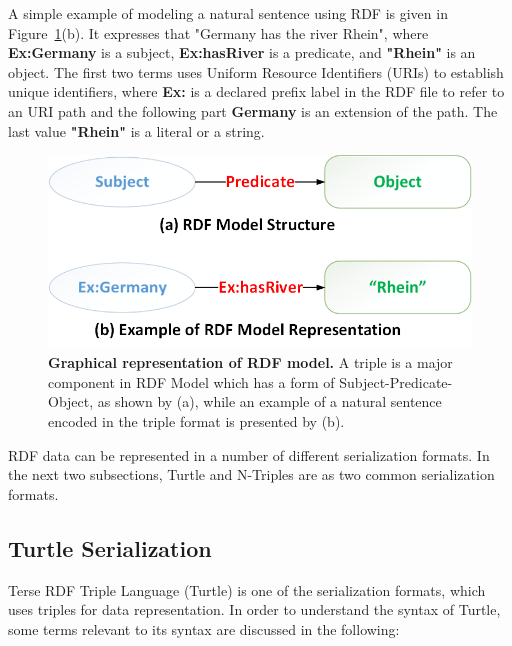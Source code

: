 A simple example of modeling a natural sentence using RDF is given in Figure~\ref{Fig:rdfModel}(b). 
It expresses that "Germany has the river Rhein", where \textbf{Ex:Germany} is a subject, \textbf{Ex:hasRiver} is a predicate, and \textbf{"Rhein"} is an object. 
The first two terms uses Uniform Resource Identifiers (URIs) to establish unique identifiers, where \textbf{Ex:} is a declared prefix label in the RDF file to refer to an URI path and the following part \textbf{Germany} is an extension of the path. 
The last value \textbf{"Rhein"} is a literal or a string. %

\begin{figure}[ht]
	\begin{center}
		\includegraphics[scale=0.4,angle=0]{images/RDF-Model}
		\setlength\belowcaptionskip{-5mm}
		\caption{\textbf{Graphical representation of RDF model.} A triple is a major component in RDF Model which has a form of Subject-Predicate-Object, as shown by (a), while an example of a natural sentence encoded in the triple format is presented by (b).}
		\label{Fig:rdfModel}
	\end{center}
\end{figure}
RDF data can be represented in a number of different serialization formats.
In the next two subsections, Turtle and N-Triples are as two common serialization formats. 

\subsection{Turtle Serialization}
Terse RDF Triple Language (Turtle) \cite{W3C:Turtle:Online} is one of the serialization formats, which uses triples for data representation. 
In order to understand the syntax of Turtle, some terms  relevant to its syntax are discussed in the following:

